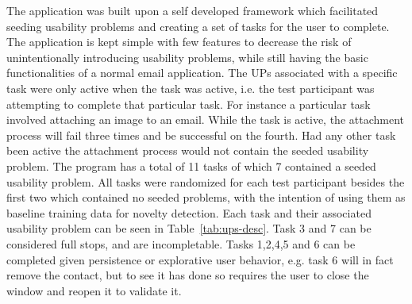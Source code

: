 The application was built upon a self developed framework which facilitated seeding usability problems and creating a set of tasks for the user to complete. 
The application is kept simple with few features to decrease the risk of unintentionally introducing usability problems, while still having the basic functionalities of a normal email application.  
The UPs associated with a specific task were only active when the task was active, i.e. the test participant was
attempting to complete that particular task.
For instance a particular task involved attaching an image to an email. 
While the task is active, the attachment process will fail three times and be successful on the fourth. 
Had any other task been active the attachment process would not contain the seeded usability problem.
The program has a total of 11 tasks of which 7 contained a seeded usability problem. 
All tasks were randomized for each test participant besides the first two which contained no seeded problems, with the
intention of using them as baseline training data for novelty detection. 
Each task and their associated usability problem can be seen in Table~\ref{tab:ups-desc}.
Task 3 and 7 can be considered full stops, and are incompletable.
Tasks 1,2,4,5 and 6 can be completed given persistence or explorative user behavior, e.g. task 6 will in fact remove the contact, but to see it has done so requires the user to close the window and reopen it to validate it.

